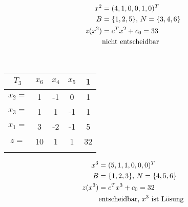 \begin{example}
\begin{minipage}[c]{0.6\textwidth}
	\end{minipage}
	\begin{minipage}[c]{0.3\textwidth}
		\begin{align}
		x^2 &= (4,1,0,0,1,0)^T\notag \\
		B &= \{1,2,5\},\, N=\{3,4,6\}\notag \\
		z(x^2) &= c^Tx^2 + c_0 = 33 \notag \\
		&\text{nicht entscheidbar} \notag 
		\end{align}
	\end{minipage} \\
	\begin{minipage}[c]{0.6\textwidth}
		\begin{center}
			\begin{tabular}{c|ccc|c}
				$T_3$ & $x_6$ & $x_4$ & $x_5$ & 1 \\
				\hline
				$x_2=$ & 1 & -1 & 0 & 1 \\
				\hline 
				$x_3=$ & 1 & 1 & -1 & 1 \\
				\hline 
				$x_1=$ & 3 & -2 & -1 & 5 \\
				\hline
				$z=$ & 10 & 1 & 1 & 32 \\
				\hline
				&  &  &  & 
			\end{tabular}
		\end{center}
	\end{minipage}
	\begin{minipage}[c]{0.3\textwidth}
		\begin{align}
		x^3 &= (5,1,1,0,0,0)^T\notag \\
		B &= \{1,2,3\},\, N=\{4,5,6\}\notag \\
		z(x^3) &= c^Tx^3 + c_0 = 32 \notag \\
		&\text{entscheidbar, } x^3 \text{ ist Lösung} \notag 
		\end{align}
	\end{minipage}
\end{example}